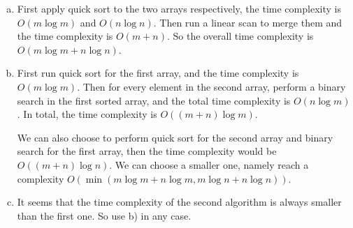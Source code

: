 \documentclass[11pt]{exam}
\begin{document}
\begin{solution}
    \begin{enumerate}[a)]
        \item First apply quick sort to the two arrays respectively, the time 
        complexity is $O(m \log m)$ and $O (n \log n)$. Then run a linear scan to merge 
        them and the time complexity is $O (m+n)$. So the overall time complexity is $O(m \log m + n \log n)$.
        \item First run quick sort for the first array, and the time complexity
        is $O(m \log m)$. Then for every element in the second array, perform a binary search in the first sorted array,
        and the total time complexity is $O(n \log m)$. In total, the time complexity is $O((m+n) \log m)$. 
        \par 
        We can also choose to perform quick sort for the second array and binary search for the first array, then the time complexity would be 
        $O((m+n)\log n)$. We can choose a smaller one, namely reach a complexity $O(\min (m\log m + n\log m , m\log n + n\log n))$.
        \item It seems that the time complexity of the second algorithm is always smaller than the 
        first one. So use b) in any case.
    \end{enumerate}
\end{solution}
\end{document}
